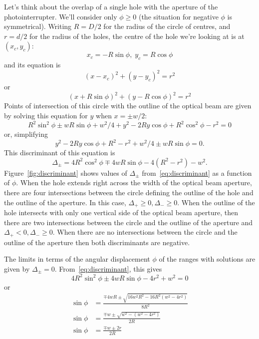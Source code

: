 \documentclass[a4paper,11pt,article]{memoir}
\begin{document}
Let's think about the overlap of a single hole with the aperture of
the photointerrupter. We'll consider only $\phi \geq 0$ (the situation
for negative $\phi$ is symmetrical). Writing $R = D / 2$ for the
radius of the circle of centres, and $r = d / 2$ for the radius of the
holes, the centre of the hole we're looking at is at $(x_c, y_c)$:
\begin{equation*}
  x_c = -R \sin \phi, \; y_c = R \cos \phi
\end{equation*}
and its equation is
\begin{equation*}
  {(x - x_c)}^2 + {(y - y_c)}^2 = r^2
\end{equation*}
or
\begin{equation*}
  {(x + R \sin \phi)}^2 + {(y - R \cos \phi)}^2 = r^2
\end{equation*}
Points of intersection of this circle with the outline of the optical
beam are given by solving this equation for $y$ when $x = \pm w/2$:
\begin{equation*}
  R^2 \sin^2 \phi \pm w R \sin \phi + w^2/4 + y^2 - 2 R y \cos \phi +
  R^2 \cos^2 \phi - r^2 = 0
\end{equation*}
or, simplifying
\begin{equation}
  \label{eq:intersection}
  y^2 - 2 R y \cos \phi + R^2 - r^2 + w^2/4 \pm w R \sin \phi = 0.
\end{equation}
This discriminant of this equation is
\begin{equation}
  \label{eq:discriminant}
  \Delta_{\pm} = 4 R^2 \cos^2 \phi \mp 4 w R \sin \phi - 4 (R^2 - r^2)
  - w^2.
\end{equation}
Figure~\ref{fig:discriminant} shows values of $\Delta_{\pm}$
from~\eqref{eq:discriminant} as a function of $\phi$. When the hole
extends right across the width of the optical beam aperture, there are
four intersections between the circle defining the outline of the hole
and the outline of the aperture. In this case, $\Delta_{+} \geq 0,
\Delta_{-} \geq 0$. When the outline of the hole intersects with only
one vertical side of the optical beam aperture, then there are two
intersections between the circle and the outline of the aperture and
$\Delta_{+} < 0, \Delta_{-} \geq 0$. When there are no intersections
between the circle and the outline of the aperture then both
discriminants are negative.

The limits in terms of the angular displacement $\phi$ of the ranges
with solutions are given by $\Delta_{\pm} = 0$.
From~\eqref{eq:discriminant}, this gives
\begin{equation*}
  4 R^2 \sin^2 \phi \pm 4 w R \sin \phi - 4 r^2 + w^2 = 0
\end{equation*}
or
\begin{align*}
  \sin \phi &= \frac{\mp 4 w R \pm \sqrt{16 w^2 R^2 - 16 R^2 (w^2 - 4 r^2)}}{8 R^2} \\
  \sin \phi &= \frac{\mp w \pm \sqrt{w^2 - (w^2 - 4 r^2)}}{2 R} \\
  \sin \phi &= \frac{\mp w \pm 2 r}{2 R}
\end{align*}
\end{document}

